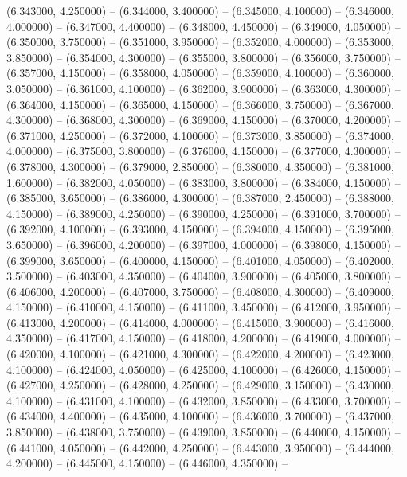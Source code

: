 (6.343000, 4.250000) -- 
(6.344000, 3.400000) -- 
(6.345000, 4.100000) -- 
(6.346000, 4.000000) -- 
(6.347000, 4.400000) -- 
(6.348000, 4.450000) -- 
(6.349000, 4.050000) -- 
(6.350000, 3.750000) -- 
(6.351000, 3.950000) -- 
(6.352000, 4.000000) -- 
(6.353000, 3.850000) -- 
(6.354000, 4.300000) -- 
(6.355000, 3.800000) -- 
(6.356000, 3.750000) -- 
(6.357000, 4.150000) -- 
(6.358000, 4.050000) -- 
(6.359000, 4.100000) -- 
(6.360000, 3.050000) -- 
(6.361000, 4.100000) -- 
(6.362000, 3.900000) -- 
(6.363000, 4.300000) -- 
(6.364000, 4.150000) -- 
(6.365000, 4.150000) -- 
(6.366000, 3.750000) -- 
(6.367000, 4.300000) -- 
(6.368000, 4.300000) -- 
(6.369000, 4.150000) -- 
(6.370000, 4.200000) -- 
(6.371000, 4.250000) -- 
(6.372000, 4.100000) -- 
(6.373000, 3.850000) -- 
(6.374000, 4.000000) -- 
(6.375000, 3.800000) -- 
(6.376000, 4.150000) -- 
(6.377000, 4.300000) -- 
(6.378000, 4.300000) -- 
(6.379000, 2.850000) -- 
(6.380000, 4.350000) -- 
(6.381000, 1.600000) -- 
(6.382000, 4.050000) -- 
(6.383000, 3.800000) -- 
(6.384000, 4.150000) -- 
(6.385000, 3.650000) -- 
(6.386000, 4.300000) -- 
(6.387000, 2.450000) -- 
(6.388000, 4.150000) -- 
(6.389000, 4.250000) -- 
(6.390000, 4.250000) -- 
(6.391000, 3.700000) -- 
(6.392000, 4.100000) -- 
(6.393000, 4.150000) -- 
(6.394000, 4.150000) -- 
(6.395000, 3.650000) -- 
(6.396000, 4.200000) -- 
(6.397000, 4.000000) -- 
(6.398000, 4.150000) -- 
(6.399000, 3.650000) -- 
(6.400000, 4.150000) -- 
(6.401000, 4.050000) -- 
(6.402000, 3.500000) -- 
(6.403000, 4.350000) -- 
(6.404000, 3.900000) -- 
(6.405000, 3.800000) -- 
(6.406000, 4.200000) -- 
(6.407000, 3.750000) -- 
(6.408000, 4.300000) -- 
(6.409000, 4.150000) -- 
(6.410000, 4.150000) -- 
(6.411000, 3.450000) -- 
(6.412000, 3.950000) -- 
(6.413000, 4.200000) -- 
(6.414000, 4.000000) -- 
(6.415000, 3.900000) -- 
(6.416000, 4.350000) -- 
(6.417000, 4.150000) -- 
(6.418000, 4.200000) -- 
(6.419000, 4.000000) -- 
(6.420000, 4.100000) -- 
(6.421000, 4.300000) -- 
(6.422000, 4.200000) -- 
(6.423000, 4.100000) -- 
(6.424000, 4.050000) -- 
(6.425000, 4.100000) -- 
(6.426000, 4.150000) -- 
(6.427000, 4.250000) -- 
(6.428000, 4.250000) -- 
(6.429000, 3.150000) -- 
(6.430000, 4.100000) -- 
(6.431000, 4.100000) -- 
(6.432000, 3.850000) -- 
(6.433000, 3.700000) -- 
(6.434000, 4.400000) -- 
(6.435000, 4.100000) -- 
(6.436000, 3.700000) -- 
(6.437000, 3.850000) -- 
(6.438000, 3.750000) -- 
(6.439000, 3.850000) -- 
(6.440000, 4.150000) -- 
(6.441000, 4.050000) -- 
(6.442000, 4.250000) -- 
(6.443000, 3.950000) -- 
(6.444000, 4.200000) -- 
(6.445000, 4.150000) -- 
(6.446000, 4.350000) -- 
